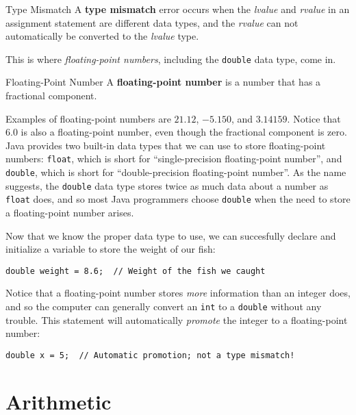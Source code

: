 \begin{defn}{Type Mismatch}\label{defn:typemismatch}
A \textbf{type mismatch} error occurs when the \textit{lvalue} and \textit{rvalue} in an assignment statement are different data types, and the \textit{rvalue} can not automatically be converted to the \textit{lvalue} type.
\end{defn}

This is where \textit{floating-point numbers}, including the \texttt{double} data type, come in.

\begin{defn}{Floating-Point Number}
A \textbf{floating-point number} is a number that has a fractional component.
\end{defn}

Examples of floating-point numbers are $21.12$, $-5.150$, and $3.14159$.  Notice that $6.0$ is also a floating-point number, even though the fractional component is zero.  Java provides two built-in data types that we can use to store floating-point numbers: \texttt{float}, which is short for ``single-precision floating-point number'', and \texttt{double}, which is short for ``double-precision floating-point number''.  As the name suggests, the \texttt{double} data type stores twice as much data about a number as \texttt{float} does, and so most Java programmers choose \texttt{double} when the need to store a floating-point number arises.

Now that we know the proper data type to use, we can succesfully declare and initialize a variable to store the weight of our fish:

\begin{verbatim}
double weight = 8.6;  // Weight of the fish we caught
\end{verbatim}

Notice that a floating-point number stores \textit{more} information than an integer does, and so the computer can generally convert an \texttt{int} to a \texttt{double} without any trouble.  This statement will automatically \textit{promote} the integer to a floating-point number:

\begin{verbatim}
double x = 5;  // Automatic promotion; not a type mismatch!
\end{verbatim}

\section{Arithmetic}

